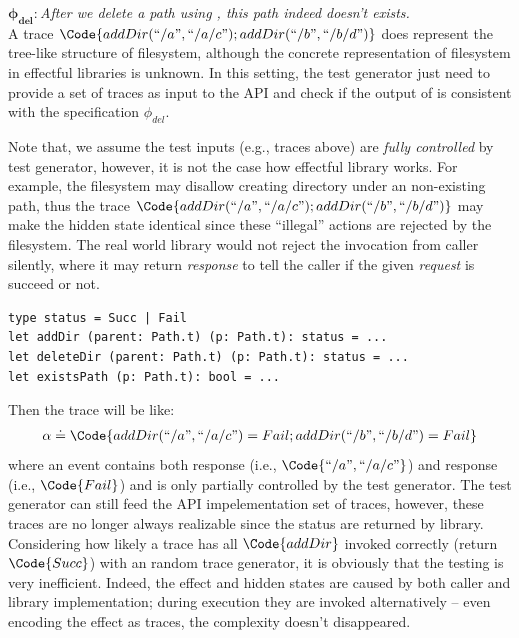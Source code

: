 $\mathbf{\phi_{del}} : $\emph{After we delete a path using , this path indeed doesn't exists. }\\

\noindent A trace $\Code{addDir(``/a", ``/a/c");addDir(``/b", ``/b/d")}$ does represent the tree-like structure of filesystem, although the concrete representation of filesystem in effectful libraries is unknown. In this setting, the test generator just need to provide a set of traces as input to the API  and check if the output of  is consistent with the specification $\phi_{del}$.

Note that, we assume the test inputs (e.g., traces above) are \emph{fully controlled} by test generator, however, it is not the case how effectful library works. For example, the filesystem may disallow creating directory under an non-existing path, thus the trace $\Code{addDir(``/a", ``/a/c");addDir(``/b", ``/b/d")}$ may make the hidden state identical since these ``illegal'' actions are rejected by the filesystem. The real world library would not reject the invocation from caller silently, where it may return \emph{response} to tell the caller if the given \emph{request} is succeed or not.
\begin{verbatim}
type status = Succ | Fail
let addDir (parent: Path.t) (p: Path.t): status = ...
let deleteDir (parent: Path.t) (p: Path.t): status = ...
let existsPath (p: Path.t): bool = ...
\end{verbatim}
\noindent 
Then the trace will be like:
\begin{align*}
    \alpha \doteq \Code{addDir(``/a", ``/a/c")=Fail;addDir(``/b", ``/b/d") = Fail}
\end{align*}\noindent
where an event contains both response (i.e., $\Code{``/a", ``/a/c"}$) and response (i.e., $\Code{Fail}$) and is only partially controlled by the test generator. The test generator can still feed the API impelementation set of traces, however, these traces are no longer always realizable since the status are returned by library. Considering how likely a trace has all $\Code{addDir}$ invoked correctly (return $\Code{Succ}$) with an random trace generator, it is obviously that the testing is very inefficient.
Indeed, the effect and hidden states are caused by both caller and library implementation; during execution they are invoked alternatively -- even encoding the effect as traces, the complexity doesn't disappeared.

